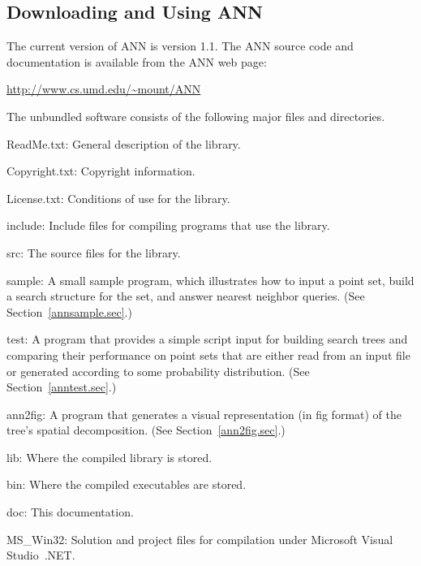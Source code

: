 \documentclass[11pt]{article}		%
\newenvironment{description*}%
  {\begin{description}%
    \setlength{\itemsep}{-0.5ex}%
    \setlength{\parsep}{0pt}}%
  {\end{description}}
\newcommand{\ANN}[0]{\textsf{ANN}}
\newcommand{\ANNversion}[0]{1.1}
\begin{document}
\subsection{Downloading and Using {\ANN}}

The current version of {\ANN} is version {\ANNversion}.  The {\ANN} source
code and documentation is available from the {\ANN} web page:
\begin{center}
    \url{http://www.cs.umd.edu/~mount/ANN}
\end{center}

The unbundled software consists of the following major files and
directories.
%
\begin{description*}
\item[\hbox{\sf ReadMe.txt:}] General description of the library.
\item[\hbox{\sf Copyright.txt:}] Copyright information.
\item[\hbox{\sf License.txt:}] Conditions of use for the library.
\item[\hbox{\sf include:}] Include files for compiling programs that use
	the library.
\item[\hbox{\sf src:}] The source files for the library.
\item[\hbox{\sf sample:}] A small sample program, which illustrates
	how to input a point set, build a search structure for the set, and
	answer nearest neighbor queries. (See Section~\ref{annsample.sec}.)
\item[\hbox{\sf test:}] A program that provides a simple script
	input for building search trees and comparing their performance on
	point sets that are either read from an input file or generated
	according to some probability distribution. (See
	Section~\ref{anntest.sec}.)
\item[\hbox{\sf ann2fig:}] A program that generates a visual
	representation (in fig format) of the tree's spatial decomposition.
	(See Section~\ref{ann2fig.sec}.)
\item[\hbox{\sf lib:}] Where the compiled library is stored.
\item[\hbox{\sf bin:}] Where the compiled executables are stored.
\item[\hbox{\sf doc:}] This documentation.
\item[\hbox{\sf MS\_Win32:}] Solution and project files for compilation
	under Microsoft Visual Studio~.NET.
\end{description*}
\end{document}
